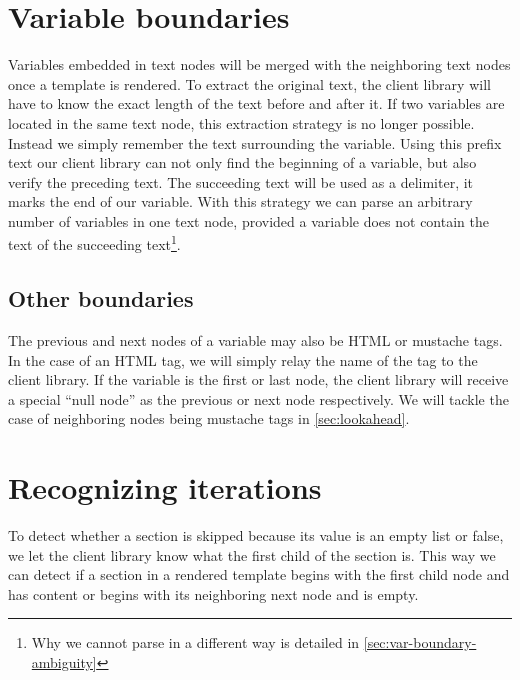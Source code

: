 \documentclass[thesis.tex]{subfiles}
\begin{document}
\section{Variable boundaries}
Variables embedded in text nodes will be merged with the neighboring text nodes
once a template is rendered. To extract the original text, the client library
will have to know the exact length of the text before and after it. If two
variables are located in the same text node, this extraction strategy is no
longer possible. Instead we simply remember the text surrounding the variable.
Using this prefix text our client library can not only find the beginning of a
variable, but also verify the preceding text. The succeeding text will be
used as a delimiter, it marks the end of our variable.
With this strategy we can parse an arbitrary number of variables in one text
node, provided a variable does not contain the text of the succeeding
text\footnote{Why we cannot parse in a different way is detailed in
\ref{sec:var-boundary-ambiguity}}.

\subsection{Other boundaries}
The previous and next nodes of a variable may also be HTML or mustache tags.
In the case of an HTML tag, we will simply relay the name of the tag to the
client library. If the variable is the first or last node, the client library
will receive a special ``null node'' as the previous or next node respectively.
We will tackle the case of neighboring nodes being mustache tags in
\ref{sec:lookahead}.

\section{Recognizing iterations}
To detect whether a section is skipped because its value is an empty
list or false, we let the client library know what the first child of the
section is.
This way we can detect if a section in a rendered template begins with the
first child node and has content or begins with its neighboring next node and is
empty.
\end{document}
